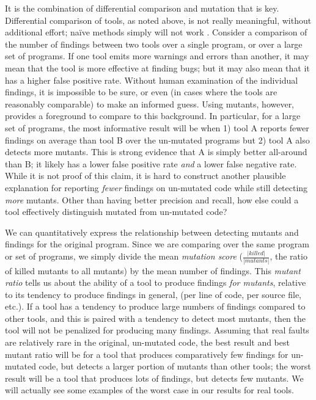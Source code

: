 It is the combination of differential comparison and mutation that is key.  Differential comparison of tools, as noted above, is not really meaningful, without additional effort; na\"ive methods simply will not work \cite{regehrRandom}.  Consider a comparison of the number of findings between two tools over a single program, or over a large set of programs.  If one tool emits more warnings and errors than another, it may mean that the tool is more effective at finding bugs; but it may also mean that it has a higher false positive rate.  Without human examination of the individual findings, it is impossible to be sure, or even (in cases where the tools are reasonably comparable) to make an informed guess.  Using mutants, however, provides a foreground to compare to this background.  In particular, for a large set of programs, the most informative result will be when 1) tool A reports fewer findings on average than tool B over the un-mutated programs but 2) tool A also detects more mutants.  This is strong evidence that A is simply better all-around than B; it likely has a lower false positive rate \emph{and} a lower false negative rate.  While it is not proof of this claim, it is hard to construct another plausible explanation for reporting \emph{fewer} findings on un-mutated code while still detecting \emph{more} mutants.  Other than having better precision and recall, how else could a tool effectively distinguish mutated from un-mutated code?

We can quantitatively express the relationship between detecting mutants and findings for the original program.  Since we are comparing over the same program or set of programs, we simply divide the mean \emph{mutation score} ($\frac{|\mathit{killed}|}{|\mathit{mutants}|}$, the ratio of killed mutants to all mutants) by the mean number of findings.  This \emph {mutant ratio} tells us about the ability of a tool to produce findings \emph{for mutants}, relative to its tendency to produce findings in general, (per line of code, per source file, etc.).  If a tool has a tendency to produce large numbers of findings compared to other tools, and this is paired with a tendency to detect most mutants, then the tool will not be penalized for producing many findings.  Assuming that real faults are relatively rare in the original, un-mutated code, the best result and best mutant ratio will be for a tool that produces comparatively few findings for un-mutated code, but detects a larger portion of mutants than other tools; the worst result will be a tool that produces lots of findings, but detects few mutants.  We will actually see some examples of the worst case in our results for real tools.

